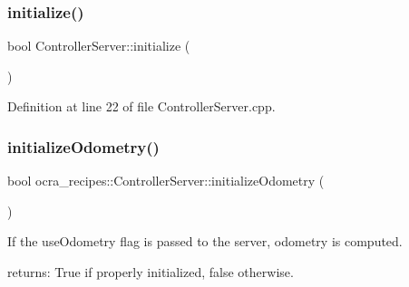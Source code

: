 \hypertarget{classocra__recipes_1_1ControllerServer_af51ea42acb8c1adc3db4cc2a256f1f46}{}\label{classocra__recipes_1_1ControllerServer_af51ea42acb8c1adc3db4cc2a256f1f46} 
\subsubsection{\texorpdfstring{initialize()}{initialize()}}
{\footnotesize\ttfamily bool Controller\+Server\+::initialize (\begin{DoxyParamCaption}{ }\end{DoxyParamCaption})}



Definition at line 22 of file Controller\+Server.\+cpp.

\hypertarget{classocra__recipes_1_1ControllerServer_a441016519ed42fee35c1fd9ae458d874}{}\label{classocra__recipes_1_1ControllerServer_a441016519ed42fee35c1fd9ae458d874} 
\subsubsection{\texorpdfstring{initialize\+Odometry()}{initializeOdometry()}}
{\footnotesize\ttfamily bool ocra\+\_\+recipes\+::\+Controller\+Server\+::initialize\+Odometry (\begin{DoxyParamCaption}{ }\end{DoxyParamCaption})}

If the use\+Odometry flag is passed to the server, odometry is computed.


\begin{DoxyItemize}
\item returns\+: True if properly initialized, false otherwise. 
\end{DoxyItemize}\hypertarget{classocra__recipes_1_1ControllerServer_a50715d81293d3ec5f0d6a60710008510}{}\label{classocra__recipes_1_1ControllerServer_a50715d81293d3ec5f0d6a60710008510} 
